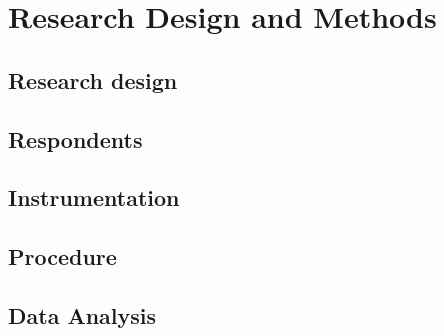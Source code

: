 \chapter{Research Design and Methods}

\section{Research design}


\section{Respondents}



\section{Instrumentation}



\section{Procedure}



\section{Data Analysis}

